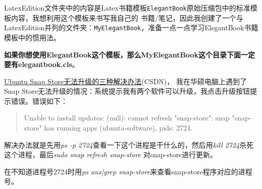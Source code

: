 \documentclass[lang=cn,newtx,10pt,scheme=chinese]{elegantbook}
\begin{document}
LatexEdition文件夹中的内容是Latex书籍模板\lstinline{ElegantBook}原始压缩包中的标准模板内容，我想利用这个模板来书写我自己的
书籍/笔记，因此我创建了一个与LatexEdition并列的文件夹：\lstinline{MyElegantBook}，准备一点一点学习ElegantBook书籍模板中的惯用法。

\textbf{如果你想使用ElegantBook这个模板，那么MyElegantBook这个目录下面一定要有elegantbook.cls}。

\href{https://blog.csdn.net/qq_44935032/article/details/130721017}{Ubuntu Snap Store无法升级的三种解决办法}(CSDN)，
我在华硕电脑上遇到了Snap Store无法升级的情况：系统提示我有两个软件可以升级，我点击升级按钮提示错误。错误如下：

\begin{quotation}
    Unable to install updates: (null): cannot refresh "snap-store": snap "snap-store" has running apps (ubuntu-software), 
    pids: 2724.
\end{quotation}

解决办法就是先用\textit{ps -p 2724}查看一下这个进程是干什么的，然后用\textit{kill 2724}杀死这个进程，最后\textit{sudo snap refresh snap-store}
对snap-store进行更新。

在不知道进程号2724时用\textit{ps aux|grep snap-store}来查看snap-store程序对应的进程号。
\end{document}
